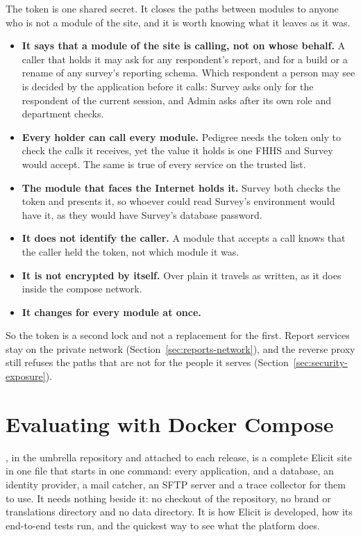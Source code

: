 \documentclass[11pt, a4paper]{article}
\begin{document}
The token is one shared secret. It closes the paths between modules to anyone who is not a
module of the site, and it is worth knowing what it leaves as it was.

\begin{itemize}
  \item \textbf{It says that a module of the site is calling, not on whose behalf.} A caller
        that holds it may ask for any respondent's report, and for a build or a rename of any
        survey's reporting schema. Which respondent a person may see is decided by the
        application before it calls: Survey asks only for the respondent of the current
        session, and Admin asks after its own role and department checks.
  \item \textbf{Every holder can call every module.} Pedigree needs the token only to check
        the calls it receives, yet the value it holds is one FHHS and Survey would accept. The
        same is true of every service on the trusted list.
  \item \textbf{The module that faces the Internet holds it.} Survey both checks the token and
        presents it, so whoever could read Survey's environment would have it, as they would
        have Survey's database password.
  \item \textbf{It does not identify the caller.} A module that accepts a call knows that the
        caller held the token, not which module it was.
  \item \textbf{It is not encrypted by itself.} Over plain  it travels as written,
        as it does inside the compose network.
  \item \textbf{It changes for every module at once.}
\end{itemize}

So the token is a second lock and not a replacement for the first. Report services stay on
the private network (Section~\ref{sec:reports-network}), and the reverse proxy still refuses
the paths that are not for the people it serves (Section~\ref{sec:security-exposure}).

\section{Evaluating with Docker Compose}
\label{sec:compose}

, in the umbrella repository and attached to each release, is a
complete Elicit site in one file that starts in one command: every application, and a database,
an identity provider, a mail catcher, an SFTP server and a trace collector for them to use. It
needs nothing beside it: no checkout of the repository, no brand or translations directory and
no data directory. It is how Elicit is developed, how its end-to-end tests run, and the quickest
way to see what the platform does.
\end{document}
